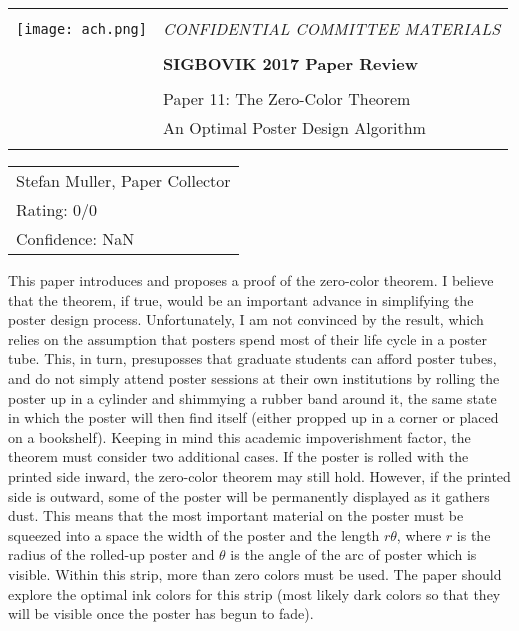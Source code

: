 \documentclass[12pt]{article}
\begin{document}
{\sffamily
\begin{tabular}{ll}
\multirow{3}{*}{\texttt{[image: ach.png]}}\\
& \Large{\em CONFIDENTIAL COMMITTEE MATERIALS} \\
&\\
& \textbf{\Huge{SIGBOVIK 2017 Paper Review}} \\
&\\
& \LARGE{Paper 11: The Zero-Color Theorem}\\
& \LARGE{An Optimal Poster Design Algorithm} \\
&\\
\hline
\end{tabular}}
\vspace{2em}
\thispagestyle{empty}

{\large\bf
\begin{tabular}{l}
Stefan Muller, Paper Collector\\
Rating: 0/0\\
Confidence: NaN\\
\end{tabular}}
\vspace{1em}

This paper introduces and proposes a proof of the zero-color theorem.
I believe that the theorem, if true, would be an important advance in
simplifying the poster design process. Unfortunately, I am not convinced
by the result, which relies on the assumption that posters spend most of their
life cycle in a poster tube. This, in turn, presuposses that graduate students
can afford poster tubes, and do not simply attend poster sessions at their
own institutions by rolling the poster up in a cylinder and shimmying a
rubber band around it, the same state in which the poster will then find
itself (either propped up in a corner or placed on a bookshelf).
Keeping in mind this academic impoverishment factor,
the theorem must consider two additional cases. If the poster is rolled with
the printed side inward, the zero-color theorem may still hold. However, if
the printed side is outward, some of the poster will be permanently displayed
as it gathers dust. This means that the most important material
on the poster must be squeezed into a space the width of the poster and the
length $r\theta$, where $r$ is the radius of the rolled-up poster and
$\theta$ is the angle of the arc of poster which is visible. Within this strip,
more than zero colors must be used. The paper should explore the optimal ink
colors for this strip (most likely dark colors so that they will be visible
once the poster has begun to fade).
\end{document}

